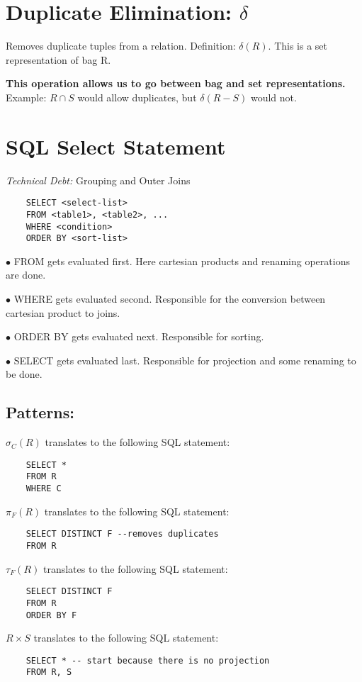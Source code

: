 \documentclass[twoside]{article}
\begin{document}
\section*{Duplicate Elimination: $\delta$}
Removes duplicate tuples from a relation. Definition: $\delta(R)$. 
This is a set representation of bag R.

\textbf{This operation allows us to go between bag and set representations.}
Example: $R \cap S$ would allow duplicates, but $\delta(R - S)$ would not.

\section*{SQL Select Statement}
\textit{Technical Debt: }Grouping and Outer Joins

\begin{verbatim}
    SELECT <select-list>
    FROM <table1>, <table2>, ...
    WHERE <condition>
    ORDER BY <sort-list>
\end{verbatim}

$\bullet$ FROM gets evaluated first. Here cartesian products and renaming 
operations are done. 

$\bullet$ WHERE gets evaluated second. Responsible for the conversion between
cartesian product to joins.

$\bullet$ ORDER BY gets evaluated next. Responsible for sorting.

$\bullet$ SELECT gets evaluated last. Responsible for projection and some
renaming to be done.

\subsection*{Patterns:}
$\sigma_C(R)$ translates to the following SQL statement:
\begin{verbatim}
    SELECT *
    FROM R
    WHERE C
\end{verbatim}

$\pi_F(R)$ translates to the following SQL statement:
\begin{verbatim}
    SELECT DISTINCT F --removes duplicates
    FROM R
\end{verbatim}

$\tau_F(R)$ translates to the following SQL statement:
\begin{verbatim}
    SELECT DISTINCT F
    FROM R
    ORDER BY F
\end{verbatim}

$R \times S$ translates to the following SQL statement:
\begin{verbatim}
    SELECT * -- start because there is no projection
    FROM R, S
\end{verbatim}
\end{document}
